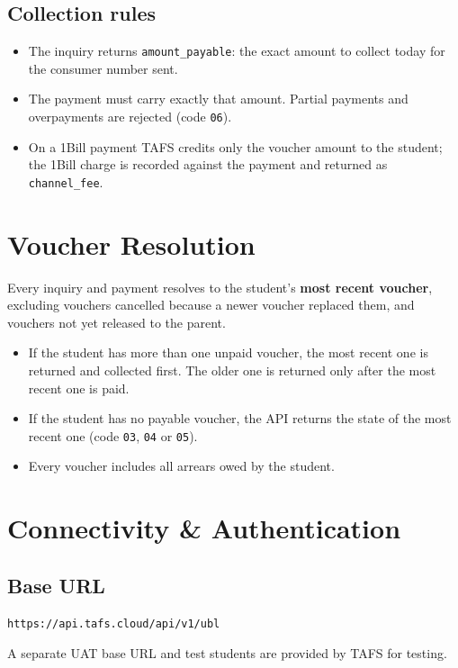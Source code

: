 \documentclass[11pt]{article}
\begin{document}
\subsection{Collection rules}
\begin{itemize}[nosep]
  \item The inquiry returns \texttt{amount\_payable}: the exact amount to collect today for the consumer number sent.
  \item The payment must carry exactly that amount. Partial payments and overpayments are rejected (code \texttt{06}).
  \item On a 1Bill payment TAFS credits only the voucher amount to the student; the 1Bill charge is recorded against the
        payment and returned as \texttt{channel\_fee}.
\end{itemize}

\newpage
\section{Voucher Resolution}\label{sec:latest}
Every inquiry and payment resolves to the student's \textbf{most recent voucher}, excluding vouchers cancelled
because a newer voucher replaced them, and vouchers not yet released to the parent.
\begin{itemize}[nosep]
  \item If the student has more than one unpaid voucher, the most recent one is returned and collected first. The older
        one is returned only after the most recent one is paid.
  \item If the student has no payable voucher, the API returns the state of the most recent one (code \texttt{03},
        \texttt{04} or \texttt{05}).
  \item Every voucher includes all arrears owed by the student.
\end{itemize}

\section{Connectivity \& Authentication}

\subsection{Base URL}\label{sec:baseurl}
\begin{lstlisting}
https://api.tafs.cloud/api/v1/ubl
\end{lstlisting}
A separate UAT base URL and test students are provided by TAFS for testing.
\end{document}
